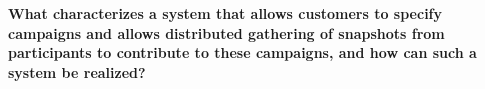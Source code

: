 
\textbf{What characterizes a system that allows customers to specify campaigns and allows distributed gathering of snapshots from participants to contribute to these campaigns, and how can such a system be realized?}